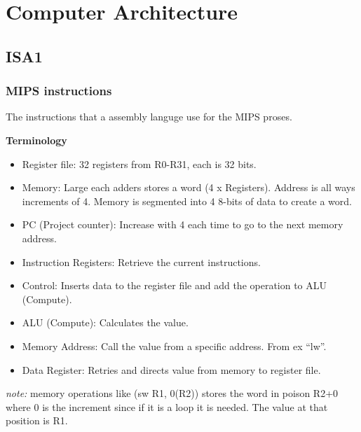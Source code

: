 \chapter{Computer Architecture}

\newpage

\section{ISA1}
\subsection{MIPS instructions}
The instructions that a assembly languge use for the MIPS proses.

\noindent\textbf{Terminology} \newline
\begin{itemize}
\item  Register file: 32 registers from R0-R31, each is 32 bits.
\item  Memory: Large each adders stores a word (4 x Registers). Address is all ways increments of 4.
       Memory is segmented into 4 8-bits of data to create a word.
\item  PC (Project counter): Increase with 4 each time to go to the next memory address.
\item  Instruction Registers: Retrieve the current instructions.
\item  Control: Inserts data to the register file and add the operation to ALU (Compute).
\item  ALU (Compute): Calculates the value.
\item  Memory Address: Call the value from a specific address. From ex ``lw''.
\item  Data Register: Retries and directs value from memory to register file.
\end{itemize}

\newpage
\emph{note:} memory operations like (sw R1, 0(R2)) stores the word in poison R2+0 where 0 is the increment
since if it is a loop it is needed. The value at that position is R1. 

